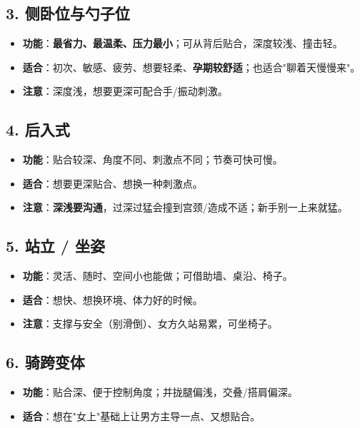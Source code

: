 \documentclass[12pt,UTF8,openany]{ctexbook}
\begin{document}
\subsection*{3. 侧卧位与勺子位}
\begin{itemize}[leftmargin=2em,itemsep=0.3em]
  \item \textbf{功能}：\textbf{最省力、最温柔、压力最小}；可从背后贴合，深度较浅、撞击轻。
  \item \textbf{适合}：初次、敏感、疲劳、想要轻柔、\textbf{孕期较舒适}；也适合"聊着天慢慢来"。
  \item \textbf{注意}：深度浅，想要更深可配合手/振动刺激。
\end{itemize}

\subsection*{4. 后入式}
\begin{itemize}[leftmargin=2em,itemsep=0.3em]
  \item \textbf{功能}：贴合较深、角度不同、刺激点不同；节奏可快可慢。
  \item \textbf{适合}：想要更深贴合、想换一种刺激点。
  \item \textbf{注意}：\textbf{深浅要沟通}，过深过猛会撞到宫颈/造成不适；新手别一上来就猛。
\end{itemize}

\subsection*{5. 站立 / 坐姿}
\begin{itemize}[leftmargin=2em,itemsep=0.3em]
  \item \textbf{功能}：灵活、随时、空间小也能做；可借助墙、桌沿、椅子。
  \item \textbf{适合}：想快、想换环境、体力好的时候。
  \item \textbf{注意}：支撑与安全（别滑倒）、女方久站易累，可坐椅子。
\end{itemize}

\subsection*{6. 骑跨变体}
\begin{itemize}[leftmargin=2em,itemsep=0.3em]
  \item \textbf{功能}：贴合深、便于控制角度；并拢腿偏浅，交叠/搭肩偏深。
  \item \textbf{适合}：想在"女上"基础上让男方主导一点、又想贴合。
\end{itemize}
\end{document}
